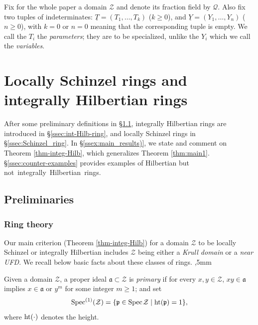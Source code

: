 \documentclass[11pt,a4paper,reqno]{amsart}
\theoremstyle{definition}
\begin{document}
\vskip 2mm

Fix for the whole paper a domain ${\mathcal Z}$ and denote its fraction field by ${\mathcal Q}$. Also fix two tuples of indeterminates: $\underline{T}=(T_1,\dots,T_k)$ ($k \geq 0$), and $\underline{Y}=(Y_1,\dots,Y_n)$ ($n \geq 0$), with $k=0$ or $n=0$ meaning that the corresponding tuple is empty. We call the $T_i$ the \emph{parameters}; they are to be specialized, unlike the $Y_i$ which we call the \emph{variables}.






\section{Locally Schinzel rings and integrally Hilbertian rings}\label{sec:presen}

After some preliminary definitions in \S \ref{ssec:preliminaries}, integrally Hilbertian rings are introduced in \S \ref{ssec:int-Hilb-ring}, and locally Schinzel rings in \S \ref{ssec:Schinzel_ring}. In \S \ref{ssex:main_results)}, we state and comment on Theorem \ref{thm-integ-Hilb}, which gen\-eralizes
Theorem \ref{thm:main1}. \S \ref{ssec:counter-examples} provides examples of Hilbertian but \hbox{not integrally Hilbertian rings.}







\subsection{Preliminaries} \label{ssec:preliminaries}

\subsubsection{Ring theory}\label{ssec:krulldom}

Our main criterion (Theorem \ref{thm-integ-Hilb}) for a domain ${\mathcal Z}$ to be locally Schinzel or integrally Hilbertian includes ${\mathcal Z}$ being either a \emph{Krull domain} or a \emph{near UFD}. We recall below basic facts about these classes of rings. 
,5mm

Given a domain ${\mathcal Z}$, a proper ideal $\mathfrak{a}\subset \mathcal{Z}$ is \emph{primary} if for every $x,y \in \mathcal{Z}$, $x y \in \mathfrak{a}$ implies $x \in \mathfrak{a}$ or $y^m$ for some integer $m \geq 1$; and set 
$$
{\rm Spec}^{(1)}(\mathcal Z)=\{ \mathfrak{p} \in {\rm Spec} \hskip 1pt \mathcal Z \mid {\rm ht}(\mathfrak{p})=1\},
$$
where ${\rm ht}(\cdot)$ denotes the height.
\end{document}

